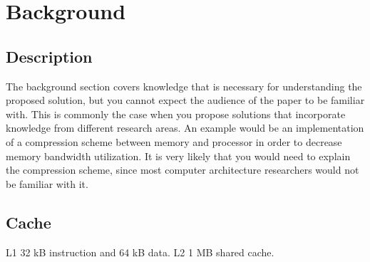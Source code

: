 \section{Background}
\subsection{Description}
The background section covers knowledge that is necessary
for understanding the proposed solution, but you cannot expect
the audience of the paper to be familiar with. This is commonly
the case when you propose solutions that incorporate
knowledge from different research areas. An example would
be an implementation of a compression scheme between
memory and processor in order to decrease memory bandwidth
utilization. It is very likely that you would need to explain
the compression scheme, since most computer architecture
researchers would not be familiar with it.

\subsection{Cache}

L1 32 kB instruction and 64 kB data.
L2 1 MB shared cache.

